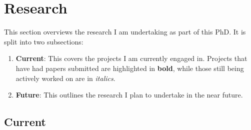 \section{Research}

This section overviews the research I am undertaking as part of this PhD.
It is split into two subsections:
\begin{enumerate}
    \item \textbf{Current}: This covers the projects I am currently engaged in. Projects that have had papers 
    submitted are highlighted in \textbf{bold}, while those still being actively worked on are in \textit{italics}.
\item \textbf{Future}: This outlines the research I plan to undertake in the near future.
\end{enumerate}
\vspace*{-1em}
\subsection*{Current}

